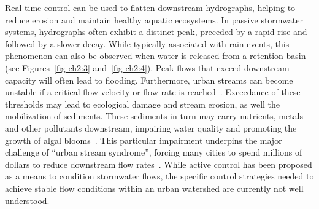 Real-time control can be used to flatten downstream hydrographs, helping to reduce erosion and maintain healthy aquatic ecosystems. In passive stormwater systems, hydrographs often exhibit a distinct peak, preceded by a rapid rise and followed by a slower decay. While typically associated with rain events, this phenomenon can also be observed when water is released from a retention basin (see Figures~\ref{fig-ch2:3} and~\ref{fig-ch2:4}). Peak flows that exceed downstream capacity will often lead to flooding. Furthermore, urban streams can become unstable if a critical flow velocity or flow rate is reached~\citep{bledsoe2002stream}. Exceedance of these thresholds may lead to ecological damage and stream erosion, as well the mobilization of sediments. These sediments in turn may carry nutrients, metals and other pollutants downstream, impairing water quality and promoting the growth of algal blooms~\cite{Michalak2013}. This particular impairment underpins the major challenge of ``urban stream syndrome'', forcing many cities to spend millions of dollars to reduce downstream flow rates~\cite{schilling2008greening, wise2008green}. 
While active control has been proposed as a means to condition stormwater flows, the specific control strategies needed to achieve stable flow conditions within an urban watershed are currently not well understood.
	
